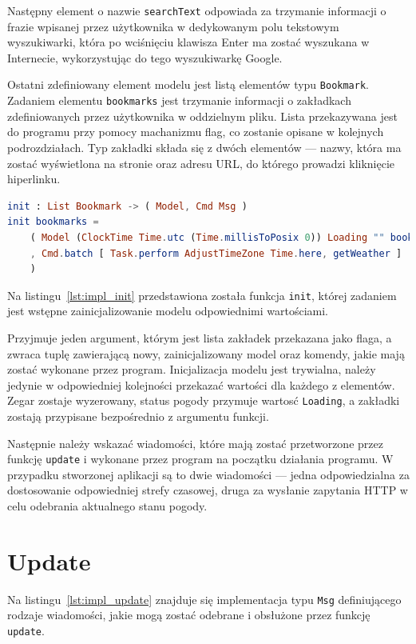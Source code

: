 \documentclass[twoside,a4paper]{report}
\begin{document}
Następny element o nazwie \texttt{searchText} odpowiada za trzymanie informacji o frazie wpisanej przez użytkownika w dedykowanym polu tekstowym wyszukiwarki, która po wciśnięciu klawisza Enter ma zostać wyszukana w Internecie, wykorzystując do tego wyszukiwarkę Google.

Ostatni zdefiniowany element modelu jest listą elementów typu \texttt{Bookmark}.
Zadaniem elementu \texttt{bookmarks} jest trzymanie informacji o zakładkach zdefiniowanych przez użytkownika w oddzielnym pliku.
Lista przekazywana jest do programu przy pomocy machanizmu flag, co zostanie opisane w kolejnych podrozdziałach.
Typ zakładki składa się z dwóch elementów --- nazwy, która ma zostać wyświetlona na stronie oraz adresu URL, do którego prowadzi kliknięcie hiperlinku.

\begin{lstlisting}[caption={Funkcja inicjalizująca model},label={lst:impl_init},language={Elm}]
init : List Bookmark -> ( Model, Cmd Msg )
init bookmarks =
    ( Model (ClockTime Time.utc (Time.millisToPosix 0)) Loading "" bookmarks
    , Cmd.batch [ Task.perform AdjustTimeZone Time.here, getWeather ]
    )
\end{lstlisting}

Na listingu~\ref{lst:impl_init} przedstawiona została funkcja \texttt{init}, której zadaniem jest wstępne zainicjalizowanie modelu odpowiednimi wartościami.

Przyjmuje jeden argument, którym jest lista zakładek przekazana jako flaga, a zwraca tuplę zawierającą nowy, zainicjalizowany model oraz komendy, jakie mają zostać wykonane przez program.
Inicjalizacja modelu jest trywialna, należy jedynie w odpowiedniej kolejności przekazać wartości dla każdego z elementów. Zegar zostaje wyzerowany, status pogody przymuje wartosć \texttt{Loading}, a zakładki zostają przypisane bezpośrednio z argumentu funkcji.

Następnie należy wskazać wiadomości, które mają zostać przetworzone przez funkcję \texttt{update} i wykonane przez program na początku działania programu.
W przypadku stworzonej aplikacji są to dwie wiadomości --- jedna odpowiedzialna za dostosowanie odpowiedniej strefy czasowej, druga za wysłanie zapytania HTTP w celu odebrania aktualnego stanu pogody.

\section{Update}
Na listingu~\ref{lst:impl_update} znajduje się implementacja typu \texttt{Msg} definiującego rodzaje wiadomości, jakie mogą zostać odebrane i obsłużone przez funkcję \texttt{update}.
\end{document}
